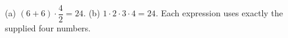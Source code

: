 (a) $\boxed{(6+6)\cdot\dfrac{4}{2}=24}$. (b) $\boxed{1\cdot2\cdot3\cdot4=24}$. Each expression uses exactly the supplied four numbers.
